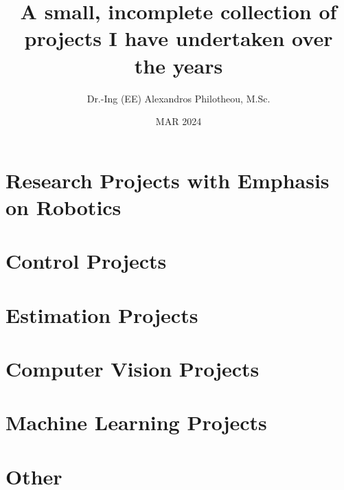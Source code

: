 






  \title{\Huge A small, incomplete collection of projects I have undertaken over the years}
  \author{Dr.-Ing (EE) Alexandros Philotheou, M.Sc. }
  \date{MAR 2024}
  \maketitle
  \vspace{2cm}

  \tableofcontents
  \thispagestyle{empty}
  \clearpage

  \section{Research Projects with Emphasis on Robotics}
    
    \newpage
    
    \newpage

  \section{Control Projects}
    
    \newpage
    
    \newpage
    
    \newpage
    
    \newpage

  \section{Estimation Projects}
    
    \newpage

  \section{Computer Vision Projects}
    
    \newpage

  \section{Machine Learning Projects}
    
    \newpage

  \section{Other}
    
    \newpage

  \cleardoublepage
\printbibliography[heading=none,notcategory=nobibliography]


